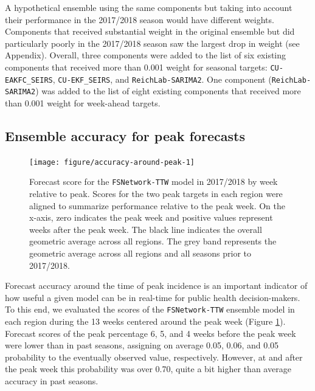 \documentclass{article}\usepackage[]{graphicx}\usepackage[]{color}
\newenvironment{knitrout}{}{} %
\begin{document}
A hypothetical ensemble using the same components but taking into account their performance in the 2017/2018 season would have different weights.
Components that received substantial weight in the original ensemble but did particularly poorly in the 2017/2018 season saw the largest drop in weight (see Appendix). 
Overall, three components were added to the list of six existing components that received more than 0.001 weight for seasonal targets: {\tt CU-EAKFC\_SEIRS}, {\tt CU-EKF\_SEIRS}, and {\tt ReichLab-SARIMA2}.
One component ({\tt ReichLab-SARIMA2}) was added to the list of eight existing components that received more than 0.001 weight for week-ahead targets.


\subsection{Ensemble accuracy for peak forecasts}

\begin{knitrout}
\color{fgcolor}\begin{figure}
\texttt{[image: figure/accuracy-around-peak-1]} \caption[Forecast score for the {\tt FSNetwork-TTW} model in 2017/2018 by week relative to peak]{Forecast score for the {\tt FSNetwork-TTW} model in 2017/2018 by week relative to peak. Scores for the two peak targets in each region were aligned to summarize performance relative to the peak week. On the x-axis, zero indicates the peak week and positive values represent weeks after the peak week. The black line indicates the overall geometric average across all regions. The grey band represents the geometric average across all regions and all seasons prior to 2017/2018.}\label{fig:accuracy-around-peak}
\end{figure}


\end{knitrout}


Forecast accuracy around the time of peak incidence is an important indicator of how useful a given model can be in real-time for public health decision-makers.
To this end, we evaluated the scores of the {\tt FSNetwork-TTW} ensemble model in each region during the 13 weeks centered around the peak week (Figure \ref{fig:accuracy-around-peak}).
Forecast scores of the peak percentage 6, 5, and 4 weeks before the peak week were lower than in past seasons, assigning on average
0.05,
0.06, and 
0.05
probability to the eventually observed value, respectively. 
However, at and after the peak week this probability was over 0.70, quite a bit higher than average accuracy in past seasons.
\end{document}
